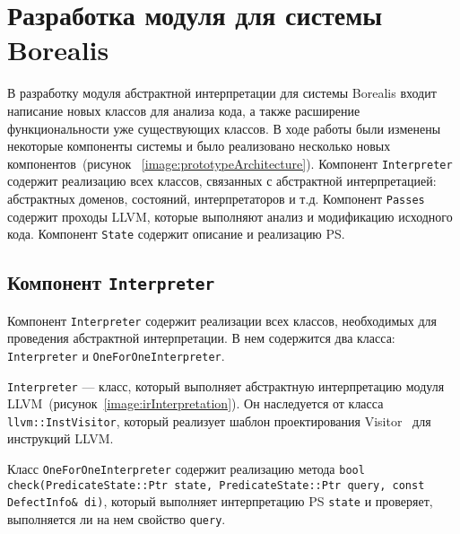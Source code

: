 \section{Разработка модуля для системы Borealis}
В разработку модуля абстрактной интерпретации для системы Borealis входит 
написание новых классов для анализа кода, а также расширение функциональности 
уже существующих классов. В ходе работы были изменены некоторые компоненты 
системы и было реализовано несколько новых компонентов~(рисунок
~\ref{image:prototypeArchitecture}). Компонент \texttt{Interpreter}
содержит реализацию всех классов, связанных с абстрактной интерпретацией:
абстрактных доменов, состояний, интерпретаторов и  т.д. Компонент \texttt{Passes}
содержит проходы LLVM, которые выполняют анализ и модификацию исходного кода.
Компонент \texttt{State} содержит описание и реализацию PS.

\subsection{Компонент \texttt{Interpreter}}
Компонент \texttt{Interpreter} содержит реализации всех классов, необходимых для
проведения абстрактной интерпретации. В нем содержится два класса: 
\texttt{Interpreter} и \texttt{OneForOneInterpreter}. 

\texttt{Interpreter} --- класс, который выполняет абстрактную интерпретацию 
модуля LLVM~(рисунок~\ref{image:irInterpretation}). Он наследуется от класса
\texttt{llvm::InstVisitor}, который реализует шаблон проектирования 
Visitor~\cite{visitor} для инструкций LLVM.

Класс \texttt{OneForOneInterpreter} содержит реализацию метода
\texttt{bool check(PredicateState::Ptr state, PredicateState::Ptr query, const 
DefectInfo\& di)}, который выполняет интерпретацию PS \texttt{state} и 
проверяет, выполняется ли на нем свойство \texttt{query}.

